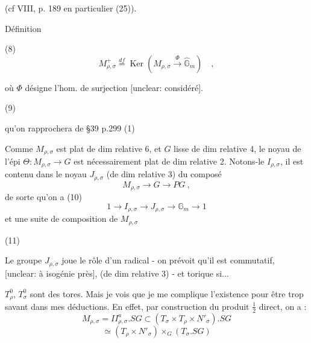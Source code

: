 \begin{enumerate}
(cf VIII, p. 189 en particulier (25)).

Définition

(8) $$M^+_{\rho,\sigma} \overset{df}{=} \operatorname{Ker}(M_{\rho,\sigma} \overset{\Phi}{\longrightarrow} \widehat{\mathbb{G}}_m) \quad ,$$

où $\Phi$ désigne l'hom. de surjection [unclear: considéré].

\newpage


(9)

qu'on rapprochera de §39 p.299 (1)

Comme $M_{\rho,\sigma}$ est plat de dim relative 6, et $G$ lisse de dim relative 4, le noyau de l'épi $\Theta : M_{\rho,\sigma} \to G$ est nécessairement plat de dim relative 2. Notons-le $I_{\rho,\sigma}$, il est contenu dans le noyau $J_{\rho,\sigma}$ (de dim relative 3) du composé
$$M_{\rho,\sigma} \to G \to PG \ ,$$
de sorte qu'on a
(10)
$$1 \to I_{\rho,\sigma} \to J_{\rho,\sigma} \to \mathbb{G}_m \to 1$$
et une suite de composition de
$M_{\rho,\sigma}$

(11)

Le groupe $J_{\rho,\sigma}$ joue le rôle d'un radical - on prévoit qu'il est commutatif, [unclear: à isogénie près], (de dim relative 3) - et torique si...

\newpage


$T_\rho^0$, $T_\sigma^0$ sont des tores.
Mais je vois que je me complique
l'existence pour être trop savant dans mes
déductions. En effet, par construction
du produit $\frac{1}{2}$ direct, on a :
$$M_{\rho,\sigma} = I\!I_{\rho,\sigma}^a . SG \subset (T_\sigma \times T_\rho \times N'_\sigma) . SG$$
$$\simeq (T_\rho \times N'_\sigma) \times_G (T_\sigma . SG)$$


\end{enumerate}
